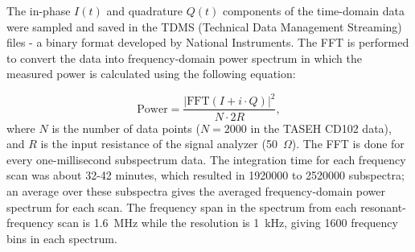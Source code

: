 
The in-phase $I(t)$ and quadrature $Q(t)$ components of the time-domain 
data were sampled and saved in the TDMS 
(Technical Data Management Streaming) files - a 
binary format developed by National Instruments.
The FFT is performed to convert the data into 
frequency-domain power spectrum in which the measured power is calculated 
using the following equation:

\begin{equation}
\label{eq:4.1}
    \text{Power} = \frac{|\text{FFT}(I+i \cdot Q)|^{2}}{N \cdot 2R},
\end{equation}
where $N$ is the number of data points ($N  = 2000$ in the TASEH 
CD102 data), and $R$ is the input resistance of the signal analyzer 
(50~$\Omega$).
The FFT is done for every one-millisecond subspectrum data. The integration 
time for each frequency scan was about 32-42 minutes, which resulted 
in 1920000 to 2520000 subspectra; an average over these subspectra gives 
the averaged frequency-domain power spectrum for each scan. 
The frequency span in the spectrum from each resonant-frequency scan is 
1.6~MHz while the 
resolution is 1~kHz, giving 1600 frequency bins in each spectrum.  



